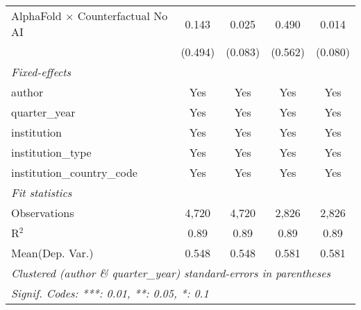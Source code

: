 \begin{tabular}{lcccc}
   AlphaFold $\times$ Counterfactual No AI  & 0.143         & 0.025          & 0.490        & 0.014\\   
                                            & (0.494)       & (0.083)        & (0.562)      & (0.080)\\   
   \midrule
   \emph{Fixed-effects}\\
   author                                   & Yes           & Yes            & Yes          & Yes\\  
   quarter\_year                            & Yes           & Yes            & Yes          & Yes\\  
   institution                              & Yes           & Yes            & Yes          & Yes\\  
   institution\_type                        & Yes           & Yes            & Yes          & Yes\\  
   institution\_country\_code               & Yes           & Yes            & Yes          & Yes\\  
   \midrule
   \emph{Fit statistics}\\
   Observations                             & 4,720         & 4,720          & 2,826        & 2,826\\  
   R$^2$                                    & 0.89          & 0.89           & 0.89         & 0.89\\  
Mean(Dep. Var.) & 0.548 & 0.548 & 0.581 & 0.581 \\
   \midrule \midrule
   \multicolumn{5}{l}{\emph{Clustered (author \& quarter\_year) standard-errors in parentheses}}\\
   \multicolumn{5}{l}{\emph{Signif. Codes: ***: 0.01, **: 0.05, *: 0.1}}\\
\end{tabular}
\par\endgroup

